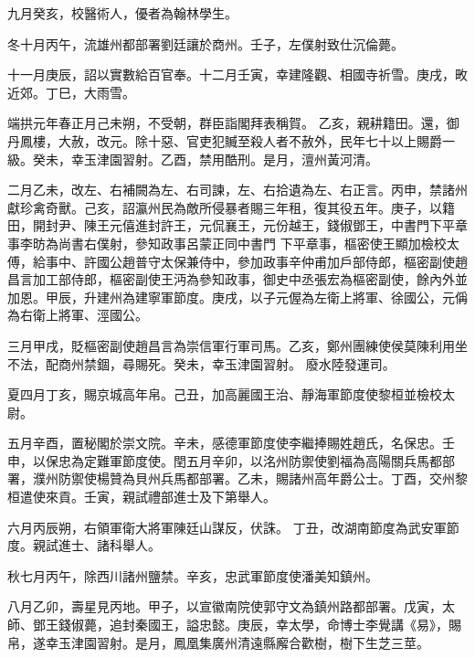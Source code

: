 \begin{pinyinscope}
 九月癸亥，校醫術人，優者為翰林學生。



 冬十月丙午，流雄州都部署劉廷讓於商州。壬子，左僕射致仕沉倫薨。



 十一月庚辰，詔以實數給百官奉。十二月壬寅，幸建隆觀、相國寺祈雪。庚戌，畋近郊。丁巳，大雨雪。



 端拱元年春正月己未朔，不受朝，群臣詣閣拜表稱賀。
 乙亥，親耕籍田。還，御丹鳳樓，大赦，改元。除十惡、官吏犯贓至殺人者不赦外，民年七十以上賜爵一級。癸未，幸玉津園習射。乙酉，禁用酷刑。是月，澶州黃河清。



 二月乙未，改左、右補闕為左、右司諫，左、右拾遺為左、右正言。丙申，禁諸州獻珍禽奇獸。己亥，詔瀛州民為敵所侵暴者賜三年租，復其役五年。庚子，以籍田，開封尹、陳王元僖進封許王，元侃襄王，元份越王，錢俶鄧王，中書門下平章事李昉為尚書右僕射，參知政事呂蒙正同中書門
 下平章事，樞密使王顯加檢校太傅，給事中、許國公趙普守太保兼侍中，參加政事辛仲甫加戶部侍郎，樞密副使趙昌言加工部侍郎，樞密副使王沔為參知政事，御史中丞張宏為樞密副使，餘內外並加恩。甲辰，升建州為建寧軍節度。庚戌，以子元偓為左衛上將軍、徐國公，元偁為右衛上將軍、涇國公。



 三月甲戌，貶樞密副使趙昌言為崇信軍行軍司馬。乙亥，鄭州團練使侯莫陳利用坐不法，配商州禁錮，尋賜死。癸未，幸玉津園習射。
 廢水陸發運司。



 夏四月丁亥，賜京城高年帛。己丑，加高麗國王治、靜海軍節度使黎桓並檢校太尉。



 五月辛酉，置秘閣於崇文院。辛未，感德軍節度使李繼捧賜姓趙氏，名保忠。壬申，以保忠為定難軍節度使。閏五月辛卯，以洺州防禦使劉福為高陽關兵馬都部署，濮州防禦使楊贊為貝州兵馬都部署。乙未，賜諸州高年爵公士。丁酉，交州黎桓遣使來貢。壬寅，親試禮部進士及下第舉人。



 六月丙辰朔，右領軍衛大將軍陳廷山謀反，伏誅。
 丁丑，改湖南節度為武安軍節度。親試進士、諸科舉人。



 秋七月丙午，除西川諸州鹽禁。辛亥，忠武軍節度使潘美知鎮州。



 八月乙卯，壽星見丙地。甲子，以宣徽南院使郭守文為鎮州路都部署。戊寅，太師、鄧王錢俶薨，追封秦國王，謚忠懿。庚辰，幸太學，命博士李覺講《易》，賜帛，遂幸玉津園習射。是月，鳳凰集廣州清遠縣廨合歡樹，樹下生芝三莖。




\end{pinyinscope}
